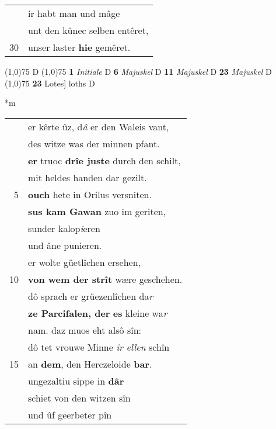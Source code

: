 \documentclass[8pt,a4paper,notitlepage]{article}
\begin{document}
\begin{table}[ht]
\begin{minipage}[t]{0.5\linewidth}
\begin{tabular}{rl}
 & ir habt man und mâge\\ 
 & unt den künec selben entêret,\\ 
30 & unser laster \textbf{hie} gemêret.\\ 
\end{tabular}
\scriptsize
\line(1,0){75} \newline
D \newline
\line(1,0){75} \newline
\textbf{1} \textit{Initiale} D  \textbf{6} \textit{Majuskel} D  \textbf{11} \textit{Majuskel} D  \textbf{23} \textit{Majuskel} D  \newline
\line(1,0){75} \newline
\textbf{23} Lotes] loths D \newline
\end{minipage}
\hspace{0.5cm}
\begin{minipage}[t]{0.5\linewidth}
\small
\begin{center}*m
\end{center}
\begin{tabular}{rl}
 & er kêrte ûz, d\textit{â} er den Waleis vant,\\ 
 & des witze was der minnen pfant.\\ 
 & \textbf{er} truoc \textbf{drîe juste} durch den schilt,\\ 
 & mit heldes handen dar gezilt.\\ 
5 & \textbf{ouch} hete in Orilus versniten.\\ 
 & \textbf{sus kam Gawan} zuo im geriten,\\ 
 & sunder kalop\textit{i}eren\\ 
 & und âne punieren.\\ 
 & er wolte güetlîchen ersehen,\\ 
10 & \textbf{von wem der strît} wære geschehen.\\ 
 & dô sprach er grüezenlîchen da\textit{r}\\ 
 & \textbf{ze Parcifalen, der} \textbf{es} kleine wa\textit{r}\\ 
 & nam. daz muos eht alsô sîn:\\ 
 & dô tet vrouwe Minne \textit{ir ellen} schîn\\ 
15 & an \textbf{dem}, den Herczeloide \textbf{bar}.\\ 
 & ungezaltiu sippe in \textbf{dâr}\\ 
 & schiet von den witzen sîn\\ 
 & und ûf geerbeter pîn\\ 

\end{tabular}
\end{minipage}
\end{table}
\end{document}
